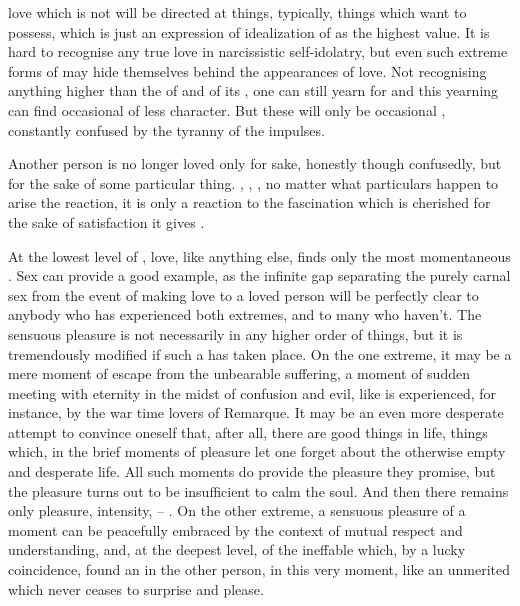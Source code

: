 
\pa %
{} love which is not  will be directed at
things, typically, things which  want to possess, which is just an
expression of idealization of  as the highest value. It is hard to
recognise any true love in narcissistic self-idolatry, but even such extreme
forms of  may hide themselves behind the appearances of love.  Not
recognising anything higher than the  of  and
 of its , one can still yearn for  and this
yearning can find occasional  of less  character. But
these will only be occasional , constantly confused by the
tyranny of the  impulses.

Another person is no longer loved only for  sake, honestly though
confusedly, but for the sake of some particular thing. , , , no
matter what particulars happen to arise the reaction, it is only a reaction
to the  fascination which is cherished for the sake
of satisfaction it gives .

\newp
\pa \imm At the lowest level of , love, like anything else, finds
only the most momentaneous .  Sex can provide a good
example, as the infinite gap separating the purely carnal sex from the event
of making love to a loved person will be perfectly clear to anybody who has
experienced both extremes, and to many who haven't.  The sensuous pleasure is not
necessarily 
 in any higher order of things, but it is tremendously
modified if such a  has taken place.  On the one extreme, it may be
a mere moment of escape from the unbearable suffering, a moment of sudden
meeting with eternity in the midst of confusion and evil, like is experienced,
for instance, by the war time lovers of Remarque.  It may be an even more desperate
attempt to convince oneself that, after all, there are good things in life,
things which, in the brief moments of pleasure let one forget about the
otherwise empty and desperate life.  All such moments do provide the pleasure
they promise, but the pleasure turns out to be insufficient to calm the soul.
And then there remains only  pleasure,  intensity, 
-- .  On the other extreme, a sensuous pleasure of
a moment can be peacefully embraced by the context of mutual respect and
understanding, and, at the deepest level, of the ineffable  which, by a
lucky coincidence, found an  in the other person, in this very
moment, like an unmerited  which never ceases to surprise and
please. 

